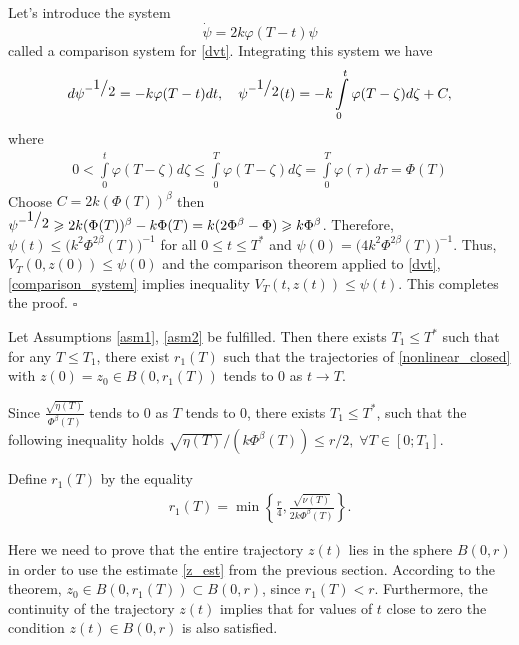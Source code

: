 \documentclass[../main.tex]{subfiles}
\begin{document}
Let's introduce the system 
\begin{equation}\label{comparison_system}
    \dot{\psi} = 2k \varphi(T-t) \psi
\end{equation}
called  a comparison system for \eqref{dvt}.  Integrating this system we have
\begin{gather*}
    d\psi^{-\frc{1}{2}} = -k \varphi(T-t) dt, \quad
    \psi^{-\frc{1}{2}}(t) = -k \int\limits_0^t \varphi(T-\zeta) d\zeta + C,
\end{gather*}
where
\begin{gather*}
    0 < \int\limits_0^t \varphi(T-\zeta) d\zeta \leqslant \int\limits_0^T \varphi(T-\zeta) d\zeta = 
    \int\limits_0^T \varphi(\tau) d\tau = \Phi(T) 
\end{gather*}
Choose  $C = 2k (\Phi(T))^{\beta}$ then $\psi^{-\frc{1}{2}} \geqslant 2k (\Phi(T))^{\beta} - k \Phi(T) = k (2\Phi^\beta - \Phi)\geqslant k\Phi^\beta $.
Therefore, $\psi(t) \leqslant \big(k^2\Phi^{2\beta}(T)\big)^{-1}$ for all $ 0 \leqslant t \leqslant T^* $ and $\psi(0) = \big(4k^2\Phi^{2\beta}(T)\big)^{-1} $.
Thus, $V_T(0,z(0))\leqslant \psi(0)$ and the comparison theorem \cite{walter} applied to \eqref{dvt}, \eqref{comparison_system}
implies inequality $V_T(t,z(t))\leqslant \psi(t)$. This completes the proof.
	\hfill $ \square $

\begin{theorem}\label{th:tends_to_zero}
    Let Assumptions \ref{asm1}, \ref{asm2} be fulfilled. Then there exists $ T_1 \leqslant T^*$ such that for any $ T \leqslant T_1$, there exist $ r_1(T)$ such that the trajectories of \eqref{nonlinear_closed} with $z(0) = z_0 \in B(0,r_1(T))$ tends to 0 as $t \to T$.
\end{theorem}

\doc 
Since $\frac{\sqrt{\eta(T)}}{\Phi^\beta(T)} $ tends to $0$ as $T$ tends to $0$, there exists $ T_1 \leqslant T^*$, such that the following inequality holds 
$ \sqrt{\eta(T)}/(k\Phi^\beta(T))  \leqslant r/{2}, \; \forall T \in [0;T_1]$.

Define $r_1(T)$ by the equality
\begin{gather}\label{r1}
    r_1(T) = \min \left\{ \frac{r}{4}, \frac{\sqrt{\nu(T)}}{2k\Phi^\beta(T)} \right\}.
\end{gather}


Here we need to prove that the entire trajectory $z(t)$ lies in the sphere $B(0,r)$ in order to use the estimate \eqref{z_est} from the previous section. According to the theorem, $z_0 \in B(0,r_1(T)) \subset B(0,r) $, since $r_1(T) < r$. Furthermore, the continuity of the trajectory $z(t)$ implies that for values of $t$ close to zero the condition $z(t) \in B(0,r) $ is also satisfied.  
\end{document}

